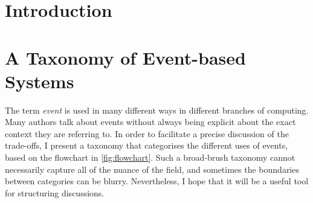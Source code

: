 \documentclass[sigconf,nonacm]{acmart}
\begin{document}

\section{Introduction}

\section{A Taxonomy of Event-based Systems}

The term \emph{event} is used in many different ways in different branches of computing.
Many authors talk about events without always being explicit about the exact context they are referring to.
In order to facilitate a precise discussion of the trade-offs, I present a taxonomy that categorises the different uses of events, based on the flowchart in \autoref{fig:flowchart}.
Such a broad-brush taxonomy cannot necessarily capture all of the nuance of the field, and sometimes the boundaries between categories can be blurry.
Nevertheless, I hope that it will be a useful tool for structuring discussions.
\end{document}
